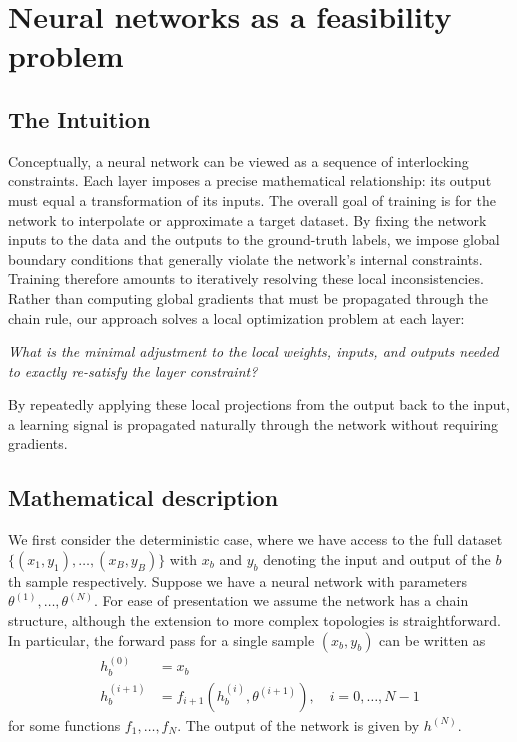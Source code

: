 \chapter{Neural networks as a feasibility problem} \label{sec:nn_feas}

\section{The Intuition}
Conceptually, a neural network can be viewed as a sequence of interlocking constraints. Each layer imposes a precise mathematical relationship: its output must equal a transformation of its inputs. The overall goal of training is for the network to interpolate or approximate a target dataset. By fixing the network inputs to the data and the outputs to the ground-truth labels, we impose global boundary conditions that generally violate the network's internal constraints. Training therefore amounts to iteratively resolving these local inconsistencies.  Rather than computing global gradients that must be propagated through the chain rule, our approach solves a local optimization problem at each layer: 
\vspace{0.5em}

\textit{What is the minimal adjustment to the local weights, inputs, and outputs needed to exactly re-satisfy the layer constraint?}

\vspace{0.5em}
By repeatedly applying these local projections from the output back to the input, a learning signal is propagated naturally through the network without requiring gradients.

\section{Mathematical description} \label{sec:math_desc}

We first consider the deterministic case, where we have access to the full dataset $\{(x_1, y_1), \ldots, (x_B, y_B)\}$ with $x_b$ and $y_b$ denoting the input and output of the $b$th sample respectively. Suppose we have a neural network with parameters $\theta^{(1)}, \ldots, \theta^{(N)}$. For ease of presentation we assume the network has a chain structure, although the extension to more complex topologies is straightforward. In particular, the forward pass for a single sample $(x_b, y_b)$ can be written as
\begin{align*}
    h^{(0)}_b &= x_b \\
    h^{(i+1)}_b &= f_{i+1}(h^{(i)}_b, \theta^{(i+1)}), \quad 
    i=0,\ldots,N-1
\end{align*}
for some functions $f_1, \ldots, f_N$. The output of the network is given by $h^{(N)}$.

